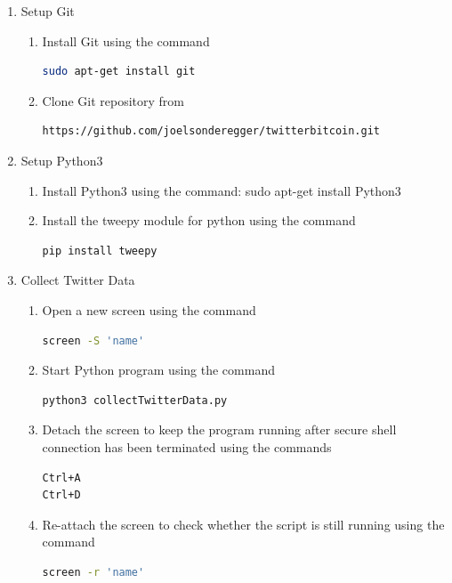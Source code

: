 \documentclass[a4paper,12pt]{article}
\begin{document}
\begin{spacing}{1.2}
\begin{enumerate}
\item Setup Git
\begin{enumerate}
\item Install Git using the command
\begin{lstlisting}[language=bash]
 sudo apt-get install git
\end{lstlisting}
\item Clone Git repository from
\begin{lstlisting}[language=bash] 
https://github.com/joelsonderegger/twitterbitcoin.git
\end{lstlisting}
\end{enumerate}

\item Setup Python3
\begin{enumerate}
\item Install Python3 using the command: sudo apt-get install Python3 \newline
\item Install the tweepy module for python using the command
\begin{lstlisting}[language=bash]
pip install tweepy
\end{lstlisting}
\end{enumerate}

\item Collect Twitter Data
\begin{enumerate}
\item Open a new screen using the command
\begin{lstlisting}[language=bash] 
screen -S 'name' 
\end{lstlisting}
\item Start Python program using the command
\begin{lstlisting}[language=bash]
python3 collectTwitterData.py
\end{lstlisting}
\item Detach the screen to keep the program running after secure shell connection has been terminated using the commands
\begin{lstlisting}[language=bash]
Ctrl+A
Ctrl+D
\end{lstlisting}
\item Re-attach the screen to check whether the script is still running using the command
\begin{lstlisting}[language=bash]
screen -r 'name'
\end{lstlisting}
\end{enumerate}


\end{enumerate}
\end{spacing}
\end{document}
